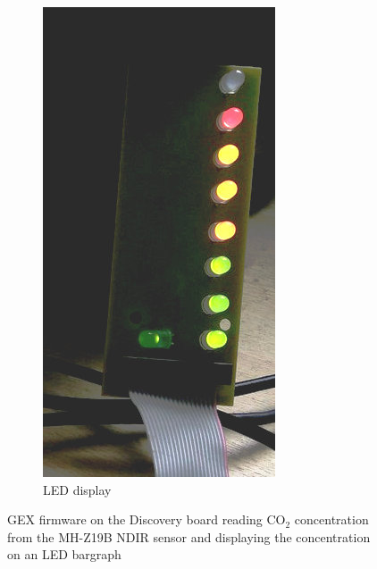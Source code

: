 \begin{figure}[H]
\begin{subfigure}{.28\textwidth}
		\includegraphics[width=.98\textwidth]{img/sipodemo.jpg}
		\caption{LED display}
	\end{subfigure}
	\caption[Demo with a CO$_2$ sensor]{GEX firmware on the Discovery board reading CO$_2$ concentration from the MH-Z19B \gls{NDIR} sensor and displaying the concentration on an \gls{LED} bargraph}
	\label{fig:democo2}
\end{figure}


